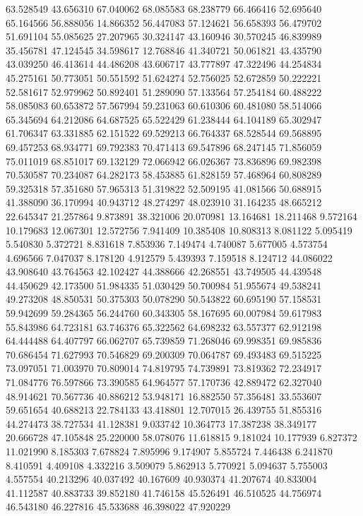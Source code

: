 63.528549
43.656310
67.040062
68.085583
68.238779
66.466416
52.695640
65.164566
56.888056
14.866352
56.447083
57.124621
56.658393
56.479702
51.691104
55.085625
27.207965
30.324147
43.160946
30.570245
46.839989
35.456781
47.124545
34.598617
12.768846
41.340721
50.061821
43.435790
43.039250
46.413614
44.486208
43.606717
43.777897
47.322496
44.254834
45.275161
50.773051
50.551592
51.624274
52.756025
52.672859
50.222221
52.581617
52.979962
50.892401
51.289090
57.133564
57.254184
60.488222
58.085083
60.653872
57.567994
59.231063
60.610306
60.481080
58.514066
65.345694
64.212086
64.687525
65.522429
61.238444
64.104189
65.302947
61.706347
63.331885
62.151522
69.529213
66.764337
68.528544
69.568895
69.457253
68.934771
69.792383
70.471413
69.547896
68.247145
71.856059
75.011019
68.851017
69.132129
72.066942
66.026367
73.836896
69.982398
70.530587
70.234087
64.282173
58.453885
61.828159
57.468964
60.808289
59.325318
57.351680
57.965313
51.319822
52.509195
41.081566
50.688915
41.388090
36.170994
40.943712
48.274297
48.023910
31.164235
48.665212
22.645347
21.257864
9.873891
38.321006
20.070981
13.164681
18.211468
9.572164
10.179683
12.067301
12.572756
7.941409
10.385408
10.808313
8.081122
5.095419
5.540830
5.372721
8.831618
7.853936
7.149474
4.740087
5.677005
4.573754
4.696566
7.047037
8.178120
4.912579
5.439393
7.159518
8.124712
44.086022
43.908640
43.764563
42.102427
44.388666
42.268551
43.749505
44.439548
44.450629
42.173500
51.984335
51.030429
50.700984
51.955674
49.538241
49.273208
48.850531
50.375303
50.078290
50.543822
60.695190
57.158531
59.942699
59.284365
56.244760
60.343305
58.167695
60.007984
59.617983
55.843986
64.723181
63.746376
65.322562
64.698232
63.557377
62.912198
64.444488
64.407797
66.062707
65.739859
71.268046
69.998351
69.985836
70.686454
71.627993
70.546829
69.200309
70.064787
69.493483
69.515225
73.097051
71.003970
70.809014
74.819795
74.739891
73.819362
72.234917
71.084776
76.597866
73.390585
64.964577
57.170736
42.889472
62.327040
48.914621
70.567736
40.886212
53.948171
16.882550
57.356481
33.553607
59.651654
40.688213
22.784133
43.418801
12.707015
26.439755
51.855316
44.274473
38.727534
41.128381
9.033742
10.364773
17.387238
38.349177
20.666728
47.105848
25.220000
58.078076
11.618815
9.181024
10.177939
6.827372
11.021990
8.185303
7.678824
7.895996
9.174907
5.855724
7.446438
6.241870
8.410591
4.409108
4.332216
3.509079
5.862913
5.770921
5.094637
5.755003
4.557554
40.213296
40.037492
40.167609
40.930374
41.207674
40.833004
41.112587
40.883733
39.852180
41.746158
45.526491
46.510525
44.756974
46.543180
46.227816
45.533688
46.398022
47.920229
